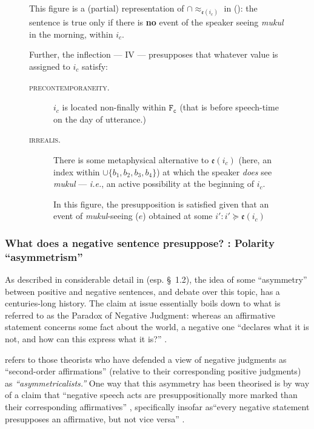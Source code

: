 \begin{figure}[H]
{\par
}


This figure is a (partial) representation of $ \cap{\approx_{\mathfrak{e}(i_c)}} $ in (\lastx): the sentence is true only if there is \textbf{no} event of the speaker seeing \textit{mukul} in the morning, within $ i_c $.

Further, the inflection --- \gls{IV} --- presupposes that whatever value is assigned to $ i_c $ satisfy:\begin{description}
	\item[\textsc{precontemporaneity.}] $ i_c $ is located non-finally within $ \mathtt{F_c} $ (that is before speech-time on the day of utterance.)
	\item[\textsc{irrealis.}] There is some metaphysical alternative to $ \mathfrak{e}(i_c) $ (here, an index within $ \cup\{b_1,b_2,b_3,b_4\} $) at which the speaker \textit{does} see \textit{mukul} --- \textit{i.e.}, an active possibility at the beginning of $ i_c $. 
	
	In this figure, the presupposition is satisfied given that an event of \textit{mukul}-seeing ($ e $) obtained at some $ i' : i'\succcurlyeq \mathfrak{e}(i_c)$ %
	\end{description}
\end{figure}


\subsubsection*{What does a negative sentence presuppose? : Polarity ``asymmetrism''} As described in considerable detail in \citealt{Horn2001} (esp. \S~1.2), the idea of some ``asymmetry'' between positive and negative sentences, and debate over this topic, has a centuries-long history. The claim at issue essentially boils down to what is referred to as the Paradox of Negative Judgment: whereas an affirmative statement concerns some fact about the world, a negative one ``declares what it is not, and how can this express what it is?'' \citetext{\citealp[49]{Horn2001}, citing \citealp[171]{Joseph1916}}.

\citeauthor{Horn2001} refers to those theorists who have defended a view of negative judgments as ``second-order affirmations'' (relative to their corresponding positive judgments) as \textit{``asymmetricalists.''} One way that this asymmetry has been theorised is by way of a claim that ``negative speech acts are presuppositionally more marked than their corresponding affirmatives'' \citep[70]{Givon1975}, specifically insofar as``every negative statement presupposes an affirmative, but not vice versa'' \citep[64]{Horn2001}.

